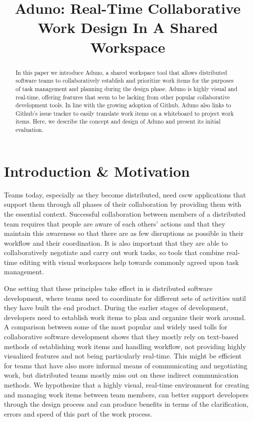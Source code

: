 \documentclass[conference]{IEEEtran}
\title{Aduno: Real-Time Collaborative Work Design In A Shared Workspace}
\author{\IEEEauthorblockN{Braden Simpson}
\IEEEauthorblockA{University of Victoria\\
Victoria, British Columbia\\
braden@uvic.ca}
\and
\IEEEauthorblockN{Eirini Kalliamvakou}
\IEEEauthorblockA{University of Victoria\\
Victoria, British Columbia\\
ikaliam@uvic.ca}
\and
\IEEEauthorblockN{Nathan Lambert}
\IEEEauthorblockA{University of Victoria\\
Victoria, British Columbia\\
nlambert@uvic.ca}}
\begin{document}
\maketitle

\begin{abstract}
In this paper we introduce Aduno, a shared workspace tool that allows distributed software teams to collaboratively establish and prioritize work items for the purposes of task management and planning during the design phase. Aduno is highly visual and real-time, offering features that seem to be lacking from other popular collaborative development tools. In line with the growing adoption of Github, Aduno also links to Github's issue tracker to easily translate work items on a whiteboard to project work items. Here, we describe the concept and design of Aduno and present its initial evaluation.
\end{abstract}

\section{Introduction \& Motivation}
\label{sec:intro}

Teams today, especially as they become distributed, need {\sc cscw} applications that support them through all phases of their collaboration by providing them with the essential context. Successful collaboration between members of a distributed team requires that people are aware of each others' actions and that they maintain this awareness so that there are as few disruptions as possible in their workflow and their coordination. It is also important that they are able to collaboratively negotiate and carry out work tasks, so tools that combine real-time editing with visual workspaces help towards commonly agreed upon task management. 

One setting that these principles take effect in is distributed software development, where teams need to coordinate for different sets of activities until they have built the end product. During the earlier stages of development, developers need to establish work items to plan and organize their work around. A comparison between some of the most popular and widely used tolls for collaborative software development shows that they mostly rely on text-based methods of establishing work items and handling workflow, not providing highly visualized features and not being particularly real-time. This might be efficient for teams that have also more informal means of communicating and negotiating work, but distributed teams mostly miss out on these indirect communication methods. We hypothesize that a highly visual, real-time environment for creating and managing work items between team members, can better support developers through the design process and can produce benefits in terms of the clarification, errors and speed of this part of the work process. 
\end{document}
